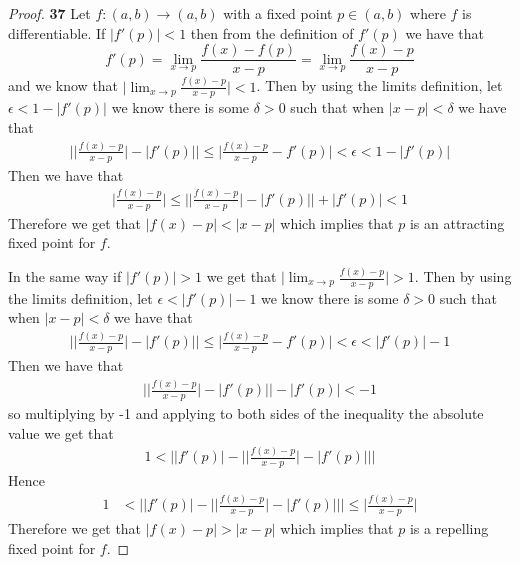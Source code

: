 \documentclass[11pt]{article}
\theoremstyle{definition}
\begin{document}
    \begin{proof}{\textbf{37}}
        Let $f:(a,b) \to (a,b)$ with a fixed point $p \in (a,b)$ where $f$
        is differentiable. If $|f'(p)| < 1$ then from the definition of $f'(p)$
        we have that
        $$f'(p) = \lim_{x\to p} \frac{f(x) - f(p)}{x-p}
        = \lim_{x\to p} \frac{f(x) - p}{x-p}$$
        and we know that $\bigg|\lim_{x\to p} \frac{f(x) - p}{x-p}\bigg| < 1$.
        Then by using the limits definition, let $\epsilon < 1 - |f'(p)|$
        we know there is some $\delta > 0$ such that when $|x - p| < \delta$
        we have that
        \begin{align*}
            \bigg|\bigg|\frac{f(x) - p}{x-p}\bigg| - |f'(p)|\bigg| \leq 
            \bigg|\frac{f(x) - p}{x-p} - f'(p)\bigg| < \epsilon < 1 - |f'(p)|
        \end{align*}
        Then we have that
        \begin{align*}
            \bigg|\frac{f(x) - p}{x-p}\bigg|
            \leq \bigg|\bigg|\frac{f(x) - p}{x-p}\bigg| - |f'(p)|\bigg| +  |f'(p)|
            < 1
        \end{align*}
        Therefore we get that $|f(x) - p| < |x -p|$ which implies that $p$ is
        an attracting fixed point for $f$.

        In the same way if $|f'(p)| > 1$ we get that
        $\bigg|\lim_{x\to p} \frac{f(x) - p}{x-p}\bigg| > 1$.
        Then by using the limits definition, let $\epsilon < |f'(p)| - 1$
        we know there is some $\delta > 0$ such that when $|x - p| < \delta$
        we have that
        \begin{align*}
            \bigg|\bigg|\frac{f(x) - p}{x-p}\bigg| - |f'(p)|\bigg| \leq 
            \bigg|\frac{f(x) - p}{x-p} - f'(p)\bigg| < \epsilon < |f'(p)| - 1
        \end{align*}
        Then we have that
        \begin{align*}
            \bigg|\bigg|\frac{f(x) - p}{x-p}\bigg| - |f'(p)|\bigg| -  |f'(p)|
            < -1
        \end{align*}
        so multiplying by -1 and applying to both sides of the inequality the 
         absolute value we get that
        \begin{align*}
            1 < 
            \bigg||f'(p)| - \bigg|\bigg|\frac{f(x) - p}{x-p}\bigg| - |f'(p)|\bigg|\bigg|
        \end{align*}
        Hence
        \begin{align*}
            1 &< \bigg||f'(p)| - \bigg|\bigg|\frac{f(x) - p}{x-p}\bigg|
            - |f'(p)|\bigg|\bigg|
            \leq \bigg|\frac{f(x) - p}{x-p}\bigg|
        \end{align*}
        Therefore we get that $|f(x) - p| > |x -p|$ which implies that $p$ is
        a repelling fixed point for $f$.
    \end{proof}
\end{document}
